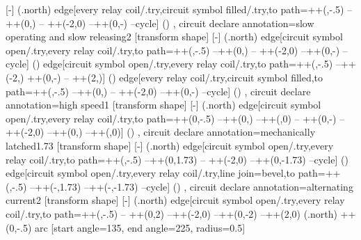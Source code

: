 {{    [-]
    (\tikzlastnode.north) edge[every relay coil/.try,circuit symbol filled/.try,to path={++(\tikzcircuitssizeunit,-.5\pgflinewidth)
--++(0,\tikzcircuitssizeunit) -- ++(-2\tikzcircuitssizeunit,0) --++(0,-\tikzcircuitssizeunit) --cycle}] ()
  },
  circuit declare annotation={slow operating and slow releasing}{2\tikzcircuitssizeunit}
  {
    [transform shape]
    [-]
    (\tikzlastnode.north) edge[circuit symbol open/.try,every relay coil/.try,to path={++(\tikzcircuitssizeunit,-.5\pgflinewidth) --++(0,\tikzcircuitssizeunit) -- ++(-2\tikzcircuitssizeunit,0) --++(0,-\tikzcircuitssizeunit) --cycle}] () edge[circuit symbol open/.try,every relay coil/.try,to path={++(\tikzcircuitssizeunit,-.5\pgflinewidth) --++(-2\tikzcircuitssizeunit,\tikzcircuitssizeunit) ++(0,-\tikzcircuitssizeunit) -- ++(2\tikzcircuitssizeunit,\tikzcircuitssizeunit)}] () edge[every relay coil/.try,circuit symbol filled,to path={++(\tikzcircuitssizeunit,\tikzcircuitssizeunit-.5\pgflinewidth) --++(0,\tikzcircuitssizeunit) -- ++(-2\tikzcircuitssizeunit,0) --++(0,-\tikzcircuitssizeunit) --cycle}] ()
  },
  circuit declare annotation={high speed}{1\tikzcircuitssizeunit}
  {
    [transform shape]
    [-]
    (\tikzlastnode.north) edge[circuit symbol open/.try,every relay coil/.try,to path={++(0,-.5\pgflinewidth) --++(0,\tikzcircuitssizeunit) --++(\tikzcircuitssizeunit,0) -- ++(0,-\tikzcircuitssizeunit) --++(-2\tikzcircuitssizeunit,0) --++(0,\tikzcircuitssizeunit) --++(\tikzcircuitssizeunit,0)}] ()
  },
  circuit declare annotation={mechanically latched}{1.73\tikzcircuitssizeunit}
  {
    [transform shape]
    [-]
    (\tikzlastnode.north) edge[circuit symbol open/.try,every relay coil/.try,to path={++(\tikzcircuitssizeunit,-.5\pgflinewidth) --++(0,1.73\tikzcircuitssizeunit) -- ++(-2\tikzcircuitssizeunit,0) --++(0,-1.73\tikzcircuitssizeunit) --cycle}] () edge[circuit symbol open/.try,every relay coil/.try,line join=bevel,to path={++(\tikzcircuitssizeunit,-.5\pgflinewidth) --++(-\tikzcircuitssizeunit,1.73\tikzcircuitssizeunit) --++(-\tikzcircuitssizeunit,-1.73\tikzcircuitssizeunit) --cycle}] ()
  },
  circuit declare annotation={alternating current}{2\tikzcircuitssizeunit}
  {
    [transform shape]
    [-]
    (\tikzlastnode.north) edge[circuit symbol open/.try,every relay coil/.try,to path={++(\tikzcircuitssizeunit,-.5\pgflinewidth) -- ++(0,2\tikzcircuitssizeunit) --++(-2\tikzcircuitssizeunit,0) --++(0,-2\tikzcircuitssizeunit) --++(2\tikzcircuitssizeunit,0)
    (\tikzlastnode.north) ++(0,\tikzcircuitssizeunit-.5\pgflinewidth) arc [start angle=135, end angle=225, radius=0.5\tikzcircuitssizeunit]
}}}
